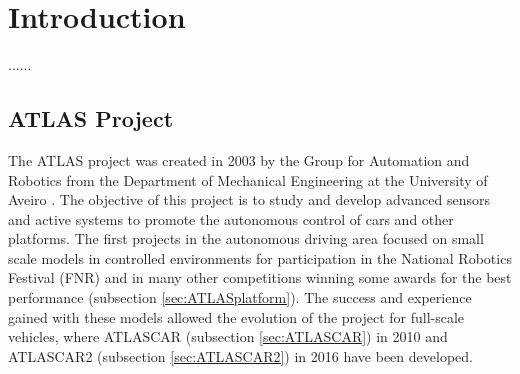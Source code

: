 \chapter{Introduction}
......
\section{ATLAS Project}\label{sec:ATLAS}
The ATLAS project was created in 2003 by the Group for Automation and Robotics from the Department of Mechanical Engineering at the University of Aveiro \cite{vsantos2010}. The objective of this project is to study and develop advanced sensors and active systems to promote the autonomous control of cars and other platforms. The first projects in the autonomous driving area focused on small scale models in controlled environments for participation in the National Robotics Festival (FNR) and in many other competitions winning some awards for the best performance (subsection \ref{sec:ATLASplatform}). The success and experience gained with these models allowed the evolution of the project for full-scale vehicles, where ATLASCAR (subsection \ref{sec:ATLASCAR}) in 2010 and ATLASCAR2 (subsection \ref{sec:ATLASCAR2}) in 2016 have been developed.

